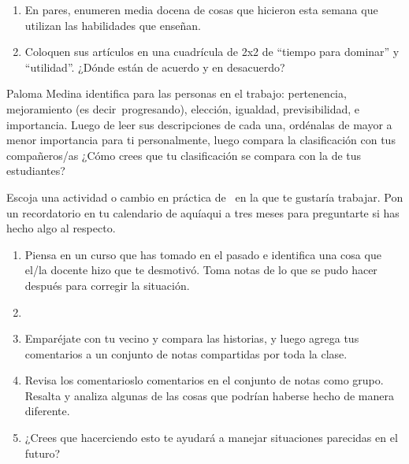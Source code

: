 

\begin{enumerate}

\item
  En pares,
  enumeren media docena de cosas que hicieron esta semana que utilizan las habilidades que enseñan.

\item
  Coloquen sus artículos en una cuadrícula de 2x2 de ``tiempo para dominar'' y ``utilidad''.
  ¿Dónde están de acuerdo y en desacuerdo?

\end{enumerate}


Paloma Medina identifica  para las personas en el trabajo:
pertenencia,
mejoramiento (es decir\ progresando),
elección,
igualdad,
previsibilidad,
e importancia.
Luego de leer sus descripciones de cada una,
ordénalas de mayor a menor importancia para ti personalmente,
luego compara la clasificación con tus compañeros/as
¿Cómo crees que tu clasificación se compara con la de tus estudiantes?


Escoja una actividad o cambio en práctica de~\cite{Lee2017} en la que te gustaría trabajar.
Pon un recordatorio en tu calendario de aquíaqui a tres meses
para preguntarte si has hecho algo al respecto.


\begin{enumerate}
\item
  Piensa en un curso que has tomado en el pasado
  e identifica una cosa que el/la docente hizo que te desmotivó.
  Toma notas de lo que se pudo hacer después para corregir la situación.
\item
\item
  Emparéjate con tu vecino y compara las historias,
  y luego agrega tus comentarios a un conjunto de notas compartidas por toda la clase.
\item
  Revisa los comentarioslo comentarios en el conjunto de notas como grupo.
  Resalta y analiza algunas de las cosas que podrían haberse hecho de manera diferente.
\item
  ¿Crees que hacerciendo esto te ayudará a manejar situaciones parecidas en el futuro?
\end{enumerate}

